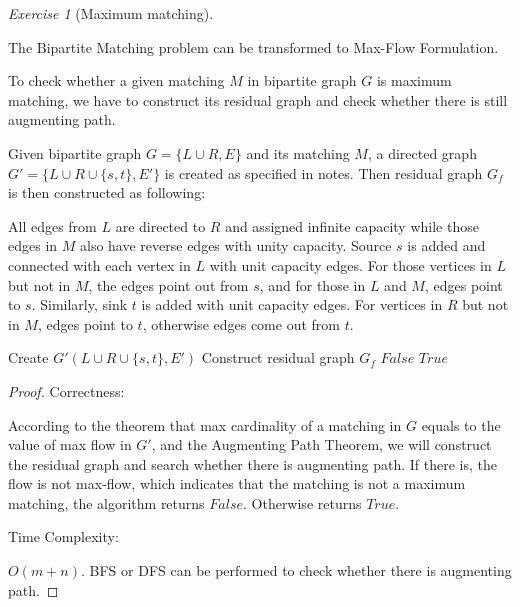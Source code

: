 \documentclass[a4paper,10pt,twoside]{article}
\theoremstyle{plain}
\theoremstyle{definition}
\theoremstyle{remark}
\newtheorem{exercise}{Exercise}
\begin{document}
\begin{exercise}[Maximum matching]\

The Bipartite Matching problem can be transformed to Max-Flow Formulation.

To check whether a given matching $M$ in bipartite graph $G$ is maximum matching, we have to construct its residual graph and check whether there is still augmenting path.

Given bipartite graph $G = \{L\cup R, E\}$ and its matching $M$, a directed graph $G' = \{L\cup R \cup\{s, t\}, E'\}$ is created as specified in notes. Then residual graph $G_f$ is then constructed as following:

All edges from $L$ are directed to $R$ and assigned infinite capacity while those edges in $M$ also have reverse edges with unity capacity. Source $s$ is added and connected with each vertex in $L$ with unit capacity edges. For those vertices in $L$ but not in $M$, the edges point out from $s$, and for those in $L$ and $M$, edges point to $s$. Similarly, sink $t$ is added with unit capacity edges. For vertices in $R$ but not in $M$, edges point to $t$, otherwise edges come out from $t$.

\begin{algorithm}[h]
	\caption{Check Max Matching($G(L\cup R, E), M$)}
	Create $G'(L\cup R \cup\{s, t\}, E')$\;
	Construct residual graph $G_f$ \;
		{\Return $False$}
	\Else
		{\Return $True$}

\end{algorithm}

\begin{proof}
Correctness:

According to the theorem that max cardinality of a matching in $G$ equals to the value of max flow in $G'$, and the Augmenting Path Theorem, we will construct the residual graph and search whether there is augmenting path. If there is, the flow is not max-flow, which indicates that the matching is not a maximum matching, the algorithm returns $False$. Otherwise returns $True$.

Time Complexity:

$O(m+n)$.
BFS or DFS can be performed to check whether there is augmenting path.
\end{proof}

\end{exercise}
\end{document}
